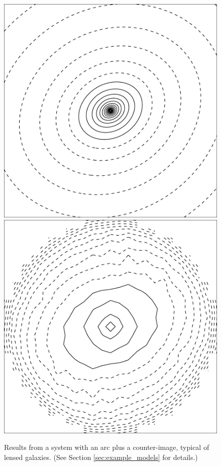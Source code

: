 \documentclass[usenatbib]{mn2e}
\newlength{\myplotswidth}
\begin{document}
\begin{figure}
  \includegraphics[width=\myplotswidth]{fig/ASW0004oux_006990_kappa}
  \includegraphics[width=\myplotswidth]{fig/006990_mass}

  \caption[result 6990 (ASW0004oux)]{Results from a system with an arc
    plus a counter-image, typical of lensed galaxies. (See Section
    \ref{sec:example_models} for details.)}
  \label{fig:6990}
\end{figure}
\end{document}
